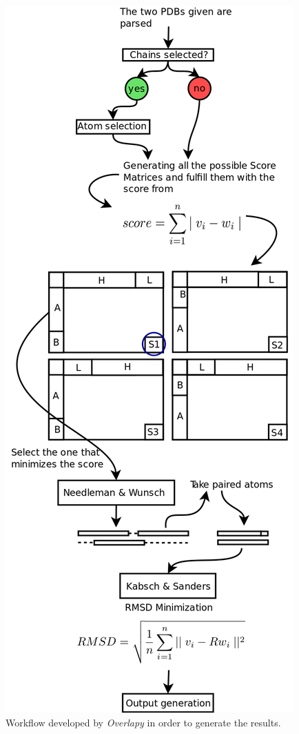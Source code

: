 \documentclass{article}
\begin{document}
\begin{figure}[h!]
	\centering
	\includegraphics[scale=0.3]{images/diagram.png}
	\caption{Workflow developed by \textit{Overlapy} in order to generate the results.}
	\label{fig:schema}
\end{figure}
\end{document}
